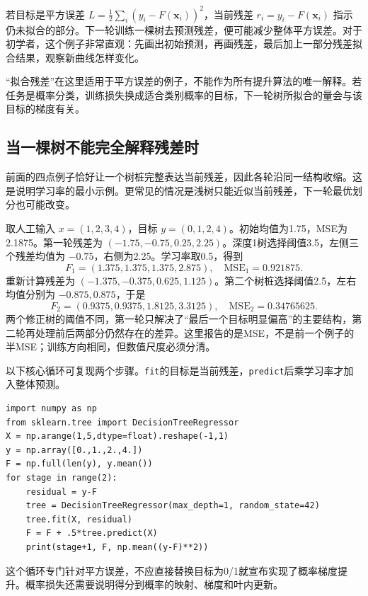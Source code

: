 若目标是平方误差 $L=\frac12\sum_i(y_i-F(\mathbf x_i))^2$，当前残差 $r_i=y_i-F(\mathbf x_i)$ 指示仍未拟合的部分。下一轮训练一棵树去预测残差，便可能减少整体平方误差。对于初学者，这个例子非常直观：先画出初始预测，再画残差，最后加上一部分残差拟合结果，观察新曲线怎样变化。


“拟合残差”在这里适用于平方误差的例子，不能作为所有提升算法的唯一解释。若任务是概率分类，训练损失换成适合类别概率的目标，下一轮树所拟合的量会与该目标的梯度有关。

\subsection{当一棵树不能完全解释残差时}
前面的四点例子恰好让一个树桩完整表达当前残差，因此各轮沿同一结构收缩。这是说明学习率的最小示例。更常见的情况是浅树只能近似当前残差，下一轮最优划分也可能改变。

取人工输入 $x=(1,2,3,4)$，目标 $y=(0,1,2,4)$。初始均值为1.75，MSE为2.1875。第一轮残差为 $(-1.75,-0.75,0.25,2.25)$。深度1树选择阈值3.5，左侧三个残差均值为 $-0.75$，右侧为2.25。学习率取0.5，得到
\[
F_1=(1.375,1.375,1.375,2.875),\quad \mathrm{MSE}_1=0.921875.
\]
重新计算残差为 $(-1.375,-0.375,0.625,1.125)$。第二个树桩选择阈值2.5，左右均值分别为 $-0.875,0.875$，于是
\[
F_2=(0.9375,0.9375,1.8125,3.3125),\quad\mathrm{MSE}_2=0.34765625.
\]
两个修正树的阈值不同，第一轮只解决了“最后一个目标明显偏高”的主要结构，第二轮再处理前后两部分仍然存在的差异。这里报告的是MSE，不是前一个例子的半MSE；训练方向相同，但数值尺度必须分清。

以下核心循环可复现两个步骤。\texttt{fit}的目标是当前残差，\texttt{predict}后乘学习率才加入整体预测。
\begin{lstlisting}[caption={逐轮重新计算残差，而不是重复使用第一轮残差}]
import numpy as np
from sklearn.tree import DecisionTreeRegressor
X = np.arange(1,5,dtype=float).reshape(-1,1)
y = np.array([0.,1.,2.,4.])
F = np.full(len(y), y.mean())
for stage in range(2):
    residual = y-F
    tree = DecisionTreeRegressor(max_depth=1, random_state=42)
    tree.fit(X, residual)
    F = F + .5*tree.predict(X)
    print(stage+1, F, np.mean((y-F)**2))
\end{lstlisting}

这个循环专门针对平方误差，不应直接替换目标为0/1就宣布实现了概率梯度提升。概率损失还需要说明得分到概率的映射、梯度和叶内更新。

